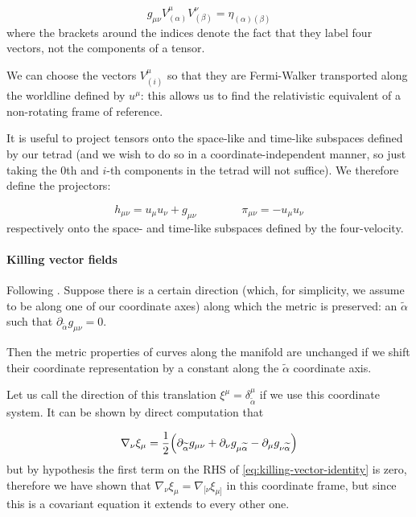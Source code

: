 \documentclass[main.tex]{subfiles}
\begin{document}
\begin{equation}
    g_{\mu\nu} V^\mu _{(\alpha)} V^\nu _{(\beta)} = \eta_{(\alpha) (\beta)}
\end{equation}
where the brackets around the indices denote the fact that they label four vectors, not the components of a tensor.

We can choose the vectors \(V_{(i)}^\mu\) so that they are Fermi-Walker transported along the worldline defined by \(u^\mu\): this allows us to find the relativistic equivalent of a non-rotating frame of reference.

It is useful to project tensors onto the space-like and time-like subspaces defined by our tetrad (and we wish to do so in a coordinate-independent manner,  so just taking the 0th and $i $-th components in the tetrad will not suffice). We therefore define the projectors:

\begin{equation}
    h_{\mu \nu} = u_\mu u_\nu + g_{\mu \nu} \qquad \qquad \pi_{\mu\nu} = -u_\mu u_\nu
\end{equation}
respectively onto the space- and time-like subspaces defined by the four-velocity.

\paragraph{Killing vector fields}

Following \cite[section 25.2, page 650]{MisnerThorneWheeler:1973}.
Suppose there is a certain direction (which, for simplicity, we assume to be along one of our coordinate axes) along which the metric is preserved: an \(\widetilde{\alpha}\) such that \(\partial_{\widetilde{\alpha}} g_{\mu\nu} =0\).

Then the metric properties of curves along the manifold are unchanged if we shift their coordinate representation by a constant along the \(\widetilde{\alpha}\) coordinate axis.

Let us call the direction of this translation \(\xi^\mu = \delta^\mu_{\widetilde{\alpha}}\) if we use this coordinate system. It can be shown by direct computation that

\begin{equation} \label{eq:killing-vector-identity}
    \nabla_{\nu} \xi_\mu = \frac{1}{2} \qty(\partial_{\widetilde{\alpha}}
    g_{\mu\nu} + \partial_\nu g_{\mu\widetilde{\alpha}} -
    \partial_\mu g_{\nu \widetilde{\alpha}})
\end{equation}
but by hypothesis the first term on the RHS of \eqref{eq:killing-vector-identity} is zero, therefore we have shown that \(\nabla_{\nu} \xi_\mu = \nabla_{[\nu} \xi_{\mu]}\) in this coordinate frame, but since this is a covariant equation it extends to every other one.
\end{document}

